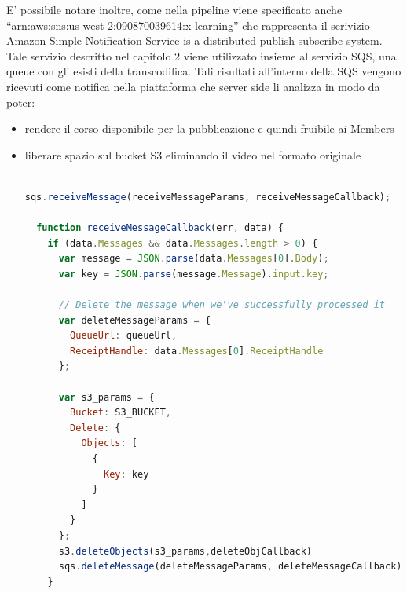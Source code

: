 E' possibile notare inoltre, come nella pipeline viene specificato anche “arn:aws:sns:us-west-2:090870039614:x-learning” che rappresenta il serivizio Amazon Simple Notification Service is a distributed publish-subscribe system.
Tale servizio descritto nel capitolo 2 viene utilizzato insieme al servizio SQS, una queue con gli esisti della transcodifica.
Tali risultati all'interno della SQS vengono ricevuti come notifica nella piattaforma che server side li analizza in modo da poter:

\begin{itemize}
\item rendere il corso disponibile per la pubblicazione e quindi fruibile ai Members
\item liberare spazio sul bucket S3 eliminando il video nel formato originale

\begin{lstlisting}[language=javascript]

sqs.receiveMessage(receiveMessageParams, receiveMessageCallback);

  function receiveMessageCallback(err, data) {
    if (data.Messages && data.Messages.length > 0) {
      var message = JSON.parse(data.Messages[0].Body);
      var key = JSON.parse(message.Message).input.key;
      
      // Delete the message when we've successfully processed it
      var deleteMessageParams = {
        QueueUrl: queueUrl,
        ReceiptHandle: data.Messages[0].ReceiptHandle
      };

      var s3_params = {
        Bucket: S3_BUCKET,
        Delete: { 
          Objects: [ 
            {
              Key: key
            }
          ]
        }
      };
      s3.deleteObjects(s3_params,deleteObjCallback)
      sqs.deleteMessage(deleteMessageParams, deleteMessageCallback);
    }
    \end{lstlisting}

\end{itemize}




